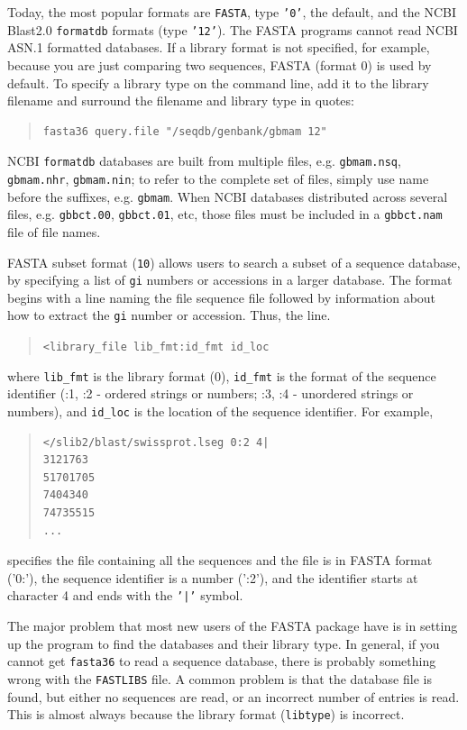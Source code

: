 \documentclass[11pt]{article}
\begin{document}
Today, the most popular formats are \texttt{FASTA}, type \texttt{'0'},
the default, and the NCBI Blast2.0 \texttt{formatdb} formats (type
\texttt{'12'}).  The FASTA programs cannot read NCBI ASN.1 formatted databases.
If a library format is not specified, for example, because
you are just comparing two sequences, FASTA (format 0) is used by
default. To specify a library type on the command line, add it to the
library filename and surround the filename and library type in quotes:
\begin{quote}
\begin{verbatim}
fasta36 query.file "/seqdb/genbank/gbmam 12"
\end{verbatim}
\end{quote}
NCBI \texttt{formatdb} databases are built from multiple files,
e.g. \texttt{gbmam.nsq}, \texttt{gbmam.nhr}, \texttt{gbmam.nin}; to
refer to the complete set of files, simply use name before the
suffixes, e.g. \texttt{gbmam}.  When NCBI databases distributed across
several files, e.g. \texttt{gbbct.00}, \texttt{gbbct.01}, etc, those
files must be included in a \texttt{gbbct.nam} file of file names.

FASTA subset format ({\tt 10}) allows users to search a subset of a
sequence database, by specifying a list of {\tt gi} numbers or accessions in
a larger database.  The format begins with a line naming the file
sequence file followed by information about how to
extract the {\tt gi} number or accession. Thus, the line.
\begin{quote}
\texttt{<library\_file lib\_fmt:id\_fmt id\_loc}
\end{quote}
where {\tt lib\_fmt} is the library format (0), {\tt id\_fmt} is the
format of the sequence identifier (:1, :2 - ordered strings or
numbers; :3, :4 - unordered strings or numbers),
and {\tt id\_loc} is the location of the sequence identifier. For example,
\begin{quote}
\begin{verbatim}
</slib2/blast/swissprot.lseg 0:2 4|
3121763
51701705
7404340
74735515
...
\end{verbatim}
\end{quote}
specifies the file containing all the sequences and the file is in
FASTA format ('0:'), the sequence identifier is a number (':2'),
and the identifier starts at character 4 and ends with the \texttt{'|'} symbol. 

The major problem that most new users of the FASTA package have is in
setting up the program to find the databases and their library type.
In general, if you cannot get \texttt{fasta36} to read a sequence
database, there is probably something wrong with the \texttt{FASTLIBS}
file.  A common problem is that the database file is found, but either
no sequences are read, or an incorrect number of entries is read.
This is almost always because the library format (\texttt{libtype}) is
incorrect.
\end{document}
